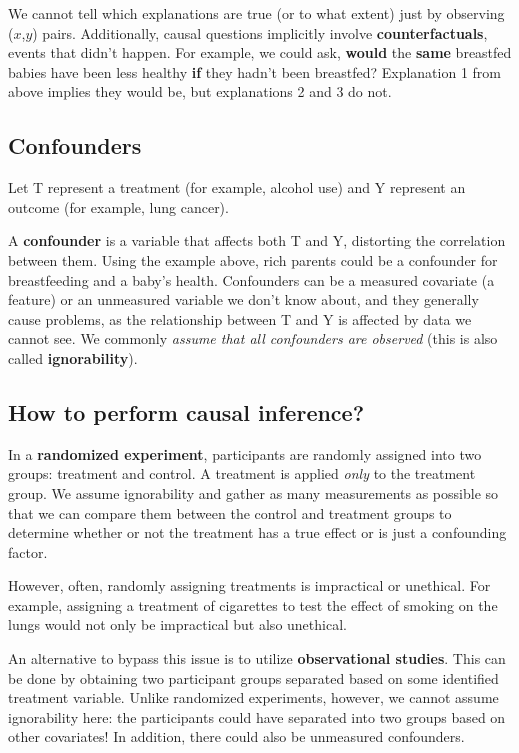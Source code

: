 \documentclass[
  letterpaper,
  DIV=11,
  numbers=noendperiod]{scrreprt}
\begin{document}
We cannot tell which explanations are true (or to what extent) just by
observing (\(x\),\(y\)) pairs. Additionally, causal questions implicitly
involve \textbf{counterfactuals}, events that didn't happen. For
example, we could ask, \textbf{would} the \textbf{same} breastfed babies
have been less healthy \textbf{if} they hadn't been breastfed?
Explanation 1 from above implies they would be, but explanations 2 and 3
do not.

\subsection{Confounders}\label{confounders}

Let T represent a treatment (for example, alcohol use) and Y represent
an outcome (for example, lung cancer).

A \textbf{confounder} is a variable that affects both T and Y,
distorting the correlation between them. Using the example above, rich
parents could be a confounder for breastfeeding and a baby's health.
Confounders can be a measured covariate (a feature) or an unmeasured
variable we don't know about, and they generally cause problems, as the
relationship between T and Y is affected by data we cannot see. We
commonly \emph{assume that all confounders are observed} (this is also
called \textbf{ignorability}).

\subsection{How to perform causal
inference?}\label{how-to-perform-causal-inference}

In a \textbf{randomized experiment}, participants are randomly assigned
into two groups: treatment and control. A treatment is applied
\emph{only} to the treatment group. We assume ignorability and gather as
many measurements as possible so that we can compare them between the
control and treatment groups to determine whether or not the treatment
has a true effect or is just a confounding factor.

However, often, randomly assigning treatments is impractical or
unethical. For example, assigning a treatment of cigarettes to test the
effect of smoking on the lungs would not only be impractical but also
unethical.

An alternative to bypass this issue is to utilize \textbf{observational
studies}. This can be done by obtaining two participant groups separated
based on some identified treatment variable. Unlike randomized
experiments, however, we cannot assume ignorability here: the
participants could have separated into two groups based on other
covariates! In addition, there could also be unmeasured confounders.
\end{document}
